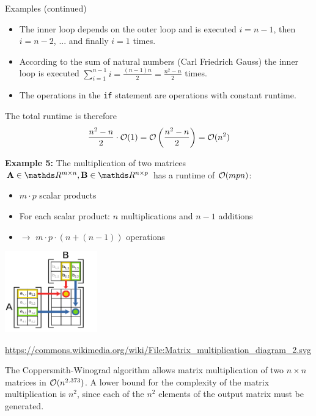 \documentclass[11pt,compress,t,notes=noshow, xcolor=table]{beamer}
\begin{document}
\begin{vbframe}{Examples (continued)}
\framebreak

\begin{itemize}
\item The inner loop depends on the outer loop and is executed $i = n - 1$, then $i = n - 2$, ... and finally $i = 1$ times.
\item According to the sum of natural numbers (Carl Friedrich Gauss) the inner loop is executed $\sum_{i = 1}^{n - 1} i = \frac{(n - 1)n}{2} = \frac{n^2 - n}{2}$ times.
\item The operations in the \texttt{if} statement are operations with constant runtime.
\end{itemize}

The total runtime is therefore
$$\frac{n^2 - n}{2} \cdot\mathcal{O}(1) = \mathcal{O}\left(\frac{n^2 - n}{2}\right) = \mathcal{O}(n^2)$$

\framebreak

\textbf{Example 5: } The multiplication of two matrices $\mathbf{A} \in \R^{m \times n}, \mathbf{B} \in \R^{n \times p}$ has a runtime of $\mathcal{O}(mpn)$:

\begin{itemize}
\item $m \cdot p$ scalar products
\item For each scalar product: $n$ multiplications and $n - 1$ additions
\item $\rightarrow$ $m \cdot p \cdot (n + (n - 1))$ operations
\end{itemize}

\begin{center}
\includegraphics[width= 0.3\textwidth]{figure_man/matrix_multiplication.png}\\
\begin{footnotesize}
\url{https://commons.wikimedia.org/wiki/File:Matrix\_multiplication\_diagram\_2.svg}
\end{footnotesize}
\end{center}


\framebreak
The Coppersmith-Winograd algorithm allows matrix multiplication of two $n\times n$ matrices in $\mathcal{O}(n^{2.373})$. A lower bound for the complexity of the matrix multiplication is $n^2$, since each of the $n^2$ elements of the output matrix must be generated.


\end{vbframe}
\end{document}
